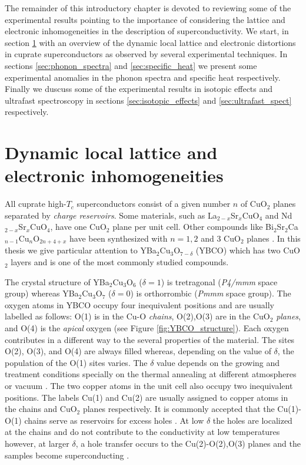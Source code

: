 The remainder of this introductory chapter is devoted to reviewing some of the experimental results pointing to the importance of considering the lattice and electronic inhomogeneities in the description of superconductivity. 
We start, in section \ref{sec:dynamicDistortions} with an overview of the dynamic local lattice and electronic distortions in cuprate superconductors as observed by several experimental techniques. 
In sections \ref{sec:phonon_spectra} and \ref{sec:specific_heat} we present some experimental anomalies in the phonon spectra and specific heat respectively.
Finally we duscuss some of the experimental results in isotopic effects and ultrafast spectroscopy in sections \ref{sec:isotopic_effects} and \ref{sec:ultrafast_spect} respectively.


\section{Dynamic local lattice and electronic inhomogeneities}
\label{sec:dynamicDistortions}

All cuprate high-$T_c$ superconductors consist of a given number $n$ of CuO$_2$ planes separated by \textit{charge reservoirs}.
Some materials, such as La$_{2-x}$Sr$_x$CuO$_4$ and Nd$_{2-x}$Sr$_x$CuO$_4$, have one CuO$_2$ plane per unit cell. 
Other compounds like Bi$_2$Sr$_2$Ca$_{n-1}$Cu$_n$O$_{2n+4+x}$ have been synthesized with $n=1,2$ and 3 CuO$_2$ planes \cite{Basov2005}.
In this thesis we give particular attention to YBa$_2$Cu$_3$O$_{7-\delta}$ (YBCO) which has two CuO$_2$ layers and is one of the most commonly studied compounds.

The crystal structure of YBa$_2$Cu$_3$O$_6$ ($\delta=1$) is tretragonal (\textit{P4/mmm} space group) whereas YBa$_2$Cu$_3$O$_7$ ($\delta=0$) is orthorrombic (\textit{Pmmm} space group).
The oxygen atoms in YBCO occupy four inequivalent positions and are usually labelled as follows: O(1) is in the Cu-O \textit{chains}, O(2),O(3) are in the CuO$_2$ \textit{planes}, and O(4) is the \textit{apical} oxygen (see Figure \ref{fig:YBCO_structure}).
Each oxygen contributes in a different way to the several properties of the material.
The sites O(2), O(3), and O(4) are always filled whereas, depending on the value of $\delta$, the population of the O(1) sites varies.
The $\delta$ value depends on the growing and treatment conditions specially on the thermal annealing at different atmospheres or vacuum \cite{Ivanov1995}.
The two copper atoms in the unit cell also occupy two inequivalent positions.
The labels Cu(1) and Cu(2) are usually assigned to copper atoms in the chains and CuO$_2$ planes respectively.
It is commonly accepted that the Cu(1)-O(1) chains serve as reservoirs for excess holes \cite{Pickett1989}. 
At low $\delta$ the holes are localized at the chains and do not contribute to the conductivity at low temperatures however, at larger $\delta$, a hole transfer occurs to the Cu(2)-O(2),O(3) planes and the samples become superconducting \cite{Cava1988}.

